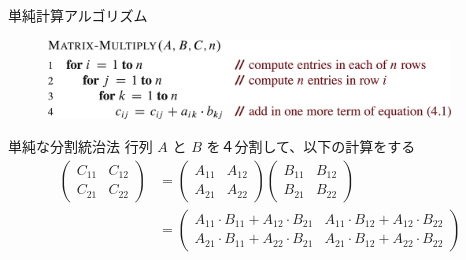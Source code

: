 \documentclass[unicode,11pt,aspectratio=169,notes]{beamer} %
\begin{document}
\begin{frame}{単純計算アルゴリズム}
  \begin{figure}
    \includegraphics[width=0.95\textwidth]{../resources/pseudo-04-01}
  \end{figure}
\end{frame}


\begin{frame}{単純な分割統治法}
  行列 $A$ と $B$ を４分割して、以下の計算をする
  \begin{align*}
    \begin{pmatrix}
      C_{11} & C_{12} \\
      C_{21} & C_{22}
    \end{pmatrix}
    & =
    \begin{pmatrix}
      A_{11} & A_{12} \\
      A_{21} & A_{22}
    \end{pmatrix}
    \begin{pmatrix}
      B_{11} & B_{12} \\
      B_{21} & B_{22}
    \end{pmatrix} \\
    & =
    \begin{pmatrix}
      A_{11} \cdot B_{11} + A_{12} \cdot B_{21} &
      A_{11} \cdot B_{12} + A_{12} \cdot B_{22} \\
      A_{21} \cdot B_{11} + A_{22} \cdot B_{21} &
      A_{21} \cdot B_{12} + A_{22} \cdot B_{22} 
    \end{pmatrix}
  \end{align*}
\end{frame}
\end{document}

